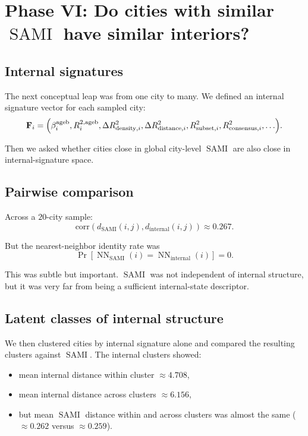 \documentclass[11pt]{article}
\newcommand{\SAMI}{\operatorname{SAMI}}
\begin{document}
\section{Phase VI: Do cities with similar \(\SAMI\) have similar interiors?}

\subsection{Internal signatures}

The next conceptual leap was from one city to many. We defined an internal signature vector for each sampled city:
\begin{equation}
\mathbf{F}_i
=
\Bigl(
\beta^{\mathrm{ageb}}_i,
R^{2,\mathrm{ageb}}_i,
\Delta R^2_{\mathrm{density},i},
\Delta R^2_{\mathrm{distance},i},
R^2_{\mathrm{subset},i},
R^2_{\mathrm{consensus},i},
\ldots
\Bigr).
\end{equation}

Then we asked whether cities close in global city-level \(\SAMI\) are also close in internal-signature space.

\subsection{Pairwise comparison}

Across a \(20\)-city sample:
\begin{equation}
\mathrm{corr}\!\left(
d_{\SAMI}(i,j), d_{\mathrm{internal}}(i,j)
\right)
\approx 0.267.
\end{equation}

But the nearest-neighbor identity rate was
\begin{equation}
\Pr\!\left[
\operatorname{NN}_{\SAMI}(i)=\operatorname{NN}_{\mathrm{internal}}(i)
\right]
= 0.
\end{equation}

This was subtle but important. \(\SAMI\) was not independent of internal structure, but it was very far from being a sufficient internal-state descriptor.

\subsection{Latent classes of internal structure}

We then clustered cities by internal signature alone and compared the resulting clusters against \(\SAMI\). The internal clusters showed:
\begin{itemize}
\item mean internal distance within cluster \(\approx 4.708\),
\item mean internal distance across clusters \(\approx 6.156\),
\item but mean \(\SAMI\) distance within and across clusters was almost the same (\(\approx 0.262\) versus \(\approx 0.259\)).
\end{itemize}
\end{document}
